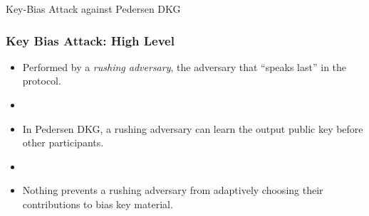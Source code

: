 \documentclass[hyperref={pdfpagelabels=true},table,dvipsnames,14pt,aspectratio=169]{beamer}
\begin{document}
\begin{frame}
  \huge
  \centering
  Key-Bias Attack against Pedersen DKG
\end{frame}

\begin{frame}
  \centering
{}
\end{frame}

\begin{frame}
  \frametitle{Key Bias Attack: High Level}

  \begin{itemize}
    \item Performed by a \emph{rushing adversary}, the adversary that ``speaks last'' in the protocol.
    \item[]
    \item<2-> In Pedersen DKG, a rushing adversary can learn the output public key before other participants.
    \item[]
    \item<3-> Nothing prevents a rushing adversary from adaptively choosing their contributions to bias key material.
  \end{itemize}
\end{frame}
\end{document}
